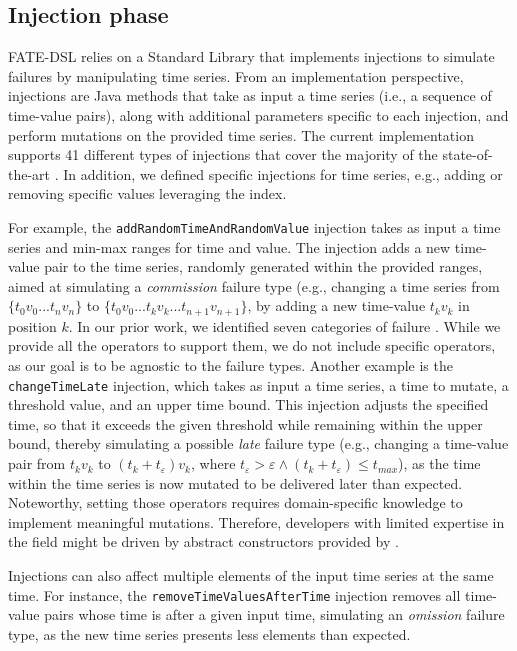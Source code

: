 \subsection{Injection phase}

FATE-DSL relies on a Standard Library that implements injections to  simulate failures by manipulating time series.
From an implementation perspective, injections are Java methods that take as input a time series (i.e., a sequence of time-value pairs), along with additional parameters specific to each injection, and perform mutations on the provided time series.
The current implementation supports 41 different types of injections that cover the majority of the state-of-the-art \citep{gomez-abajo_wodel-test_2021,cotroneo_profipy_2020}. In addition, we defined specific injections for time series, e.g., adding or removing specific values leveraging the index.  

For example, the \texttt{addRandomTimeAndRandomValue} injection takes as input a time series and min-max ranges for time and value. The injection adds a new time-value pair to the time series, randomly generated within the provided ranges, aimed at simulating a \textit{commission} failure type (e.g., changing a time series from $\{t_0 v_0 ... t_n v_n\}$ to $\{t_0 v_0 ... t_k v_k ... t_{n+1} v_{n+1}\}$, by adding a new time-value $t_k v_k$ in position $k$. In our prior work, we identified seven categories of failure \citep{10350526}. While we provide all the operators to support them, we do not include specific operators, as our goal is to be agnostic to the failure types.  
Another example is the \texttt{changeTimeLate} injection, which takes as input a time series, a time to mutate, a threshold value, and an upper time bound. This injection adjusts the specified time,  so that it exceeds the given threshold while remaining within the upper bound, thereby simulating a possible \textit{late} failure type (e.g., changing a time-value pair from $t_k v_k$ to $(t_k + t_\varepsilon) v_k $, where $t_\varepsilon > \varepsilon \land (t_k + t_\varepsilon) \leq t_{max}$), as the time within the time series is now mutated to be delivered later than expected. Noteworthy, setting those operators requires domain-specific knowledge to implement meaningful mutations. Therefore, developers with limited expertise in the field might be driven by abstract constructors provided by \tool.   

Injections can also affect multiple elements of the input time series at the same time. For instance, the \texttt{removeTimeValuesAfterTime} injection removes all time-value pairs whose time is after a given input time, simulating an \textit{omission} failure type, as the new time series presents less elements than expected.

